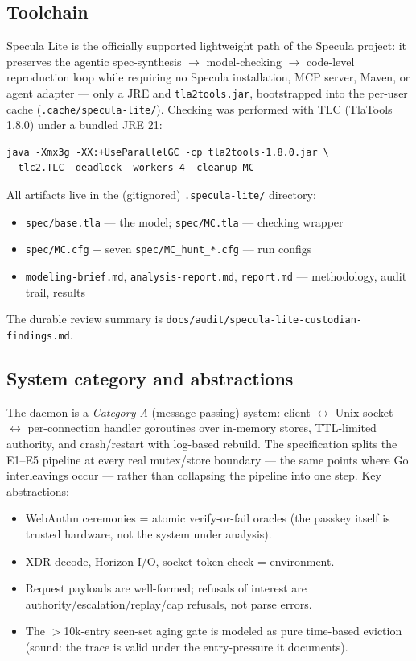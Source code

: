 \documentclass[11pt]{article}
\newcommand{\code}[1]{\texttt{#1}}
\newcommand{\file}[1]{\texttt{#1}}
\begin{document}
\subsection{Toolchain}

Specula Lite is the officially supported lightweight path of the Specula
project: it preserves the agentic spec-synthesis $\rightarrow$ model-checking
$\rightarrow$ code-level reproduction loop while requiring no Specula
installation, MCP server, Maven, or agent adapter — only a JRE and
\code{tla2tools.jar}, bootstrapped into the per-user cache
(\file{.cache/specula-lite/}).
Checking was performed with TLC (TlaTools 1.8.0) under a bundled JRE 21:
\begin{lstlisting}
java -Xmx3g -XX:+UseParallelGC -cp tla2tools-1.8.0.jar \
  tlc2.TLC -deadlock -workers 4 -cleanup MC
\end{lstlisting}
All artifacts live in the (gitignored) \file{.specula-lite/} directory:
\begin{itemize}[nosep]
  \item \file{spec/base.tla} — the model; \file{spec/MC.tla} — checking wrapper
  \item \file{spec/MC.cfg} + seven \file{spec/MC\_hunt\_*.cfg} — run configs
  \item \file{modeling-brief.md}, \file{analysis-report.md}, \file{report.md} —
        methodology, audit trail, results
\end{itemize}
The durable review summary is
\file{docs/audit/specula-lite-custodian-findings.md}.

\subsection{System category and abstractions}

The daemon is a \emph{Category A} (message-passing) system: client
$\leftrightarrow$ Unix socket $\leftrightarrow$ per-connection handler
goroutines over in-memory stores, TTL-limited authority, and crash/restart with
log-based rebuild. The specification splits the E1--E5 pipeline at every real
mutex/store boundary — the same points where Go interleavings occur — rather
than collapsing the pipeline into one step. Key abstractions:

\begin{itemize}[nosep]
  \item WebAuthn ceremonies = atomic verify-or-fail oracles (the passkey itself
        is trusted hardware, not the system under analysis).
  \item XDR decode, Horizon I/O, socket-token check = environment.
  \item Request payloads are well-formed; refusals of interest are
        authority/escalation/replay/cap refusals, not parse errors.
  \item The $>$10k-entry seen-set aging gate is modeled as pure time-based
        eviction (sound: the trace is valid under the entry-pressure it
        documents).
\end{itemize}
\end{document}
